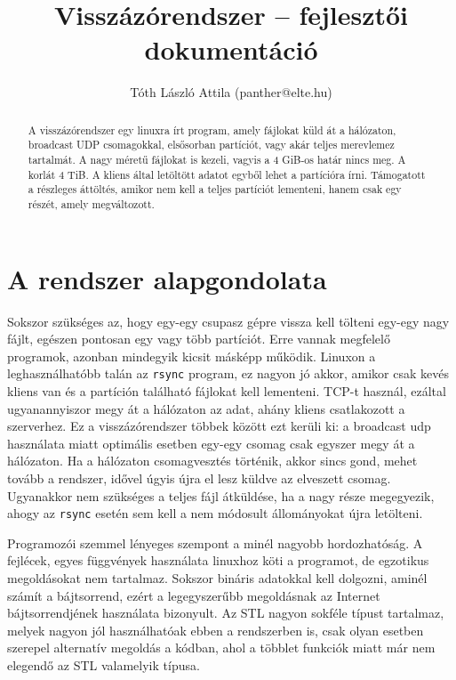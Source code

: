 \documentclass[fleqn,10pt,a4paper,titlepage]{article}
\title{Visszázórendszer -- fejlesztői dokumentáció}
\author{Tóth László Attila (panther@elte.hu)}
\date{}
\begin{document}
  \maketitle
  \mktoc

  \begin{abstract}
    A visszázórendszer egy linuxra írt program, amely fájlokat küld át a hálózaton, broadcast UDP csomagokkal,
    elsősorban partíciót, vagy akár teljes merevlemez tartalmát. A nagy méretű fájlokat is kezeli, vagyis a 4 GiB-os
    határ nincs meg. A korlát 4 TiB. A kliens által letöltött adatot egyből lehet a partícióra írni. Támogatott a
    részleges áttöltés, amikor nem kell a teljes partíciót lementeni, hanem csak egy részét, amely megváltozott.
  \end{abstract}

  \section{A rendszer alapgondolata}
  Sokszor szükséges az, hogy egy-egy csupasz gépre vissza kell tölteni egy-egy nagy fájlt, egészen pontosan egy vagy
  több partíciót. Erre vannak megfelelő programok, azonban mindegyik kicsit másképp működik. Linuxon a leghasználhatóbb
  talán az \texttt{rsync} program, ez nagyon jó akkor, amikor csak kevés kliens van és a partíción található fájlokat
  kell lementeni. TCP-t használ, ezáltal ugyanannyiszor megy át a hálózaton az adat, ahány kliens csatlakozott a
  szerverhez.
  Ez a visszázórendszer többek között ezt kerüli ki: a broadcast udp használata miatt optimális esetben egy-egy csomag
  csak egyszer megy át a hálózaton. Ha a hálózaton csomagvesztés történik, akkor sincs gond, mehet tovább a rendszer,
  idővel úgyis újra el lesz küldve az elveszett csomag. Ugyanakkor nem szükséges a teljes fájl átküldése, ha a nagy
  része megegyezik, ahogy az \texttt{rsync} esetén sem kell a nem módosult állományokat újra letölteni.

  Programozói szemmel lényeges szempont a minél nagyobb hordozhatóság. A fejlécek, egyes függvények használata
  linuxhoz köti a programot, de egzotikus megoldásokat nem tartalmaz. Sokszor bináris adatokkal kell dolgozni, aminél
  számít a bájtsorrend, ezért a legegyszerűbb megoldásnak az Internet bájtsorrendjének használata bizonyult. Az STL
  nagyon sokféle típust tartalmaz, melyek nagyon jól használhatóak ebben a rendszerben is, csak olyan esetben szerepel
  alternatív megoldás a kódban, ahol a többlet funkciók miatt már nem elegendő az STL valamelyik típusa.
  
\end{document}

